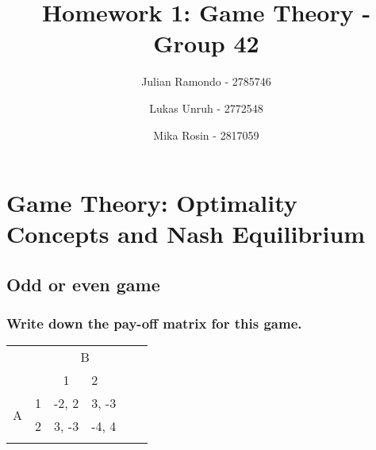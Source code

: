 \documentclass[11pt]{article}
\title{Homework 1: Game Theory - Group 42}
\author{Julian Ramondo - 2785746 \and Lukas Unruh - 2772548 \and Mika Rosin - 2817059}
\begin{document}
    \maketitle


    \section{Game Theory: Optimality Concepts and Nash Equilibrium}

    \subsection{Odd or even game}

    \subsubsection{Write down the pay-off matrix for this game.}
    \begin{table}[h]
        \centering
        \begin{tabular}{llllll}
            & & \multicolumn{2}{c}{B} & & \\
            &                        & \multicolumn{1}{c}{1}      & 2                          & & \\ \cline{3-4}
            \multirow{2}{*}{A} & \multicolumn{1}{r|}{1} & \multicolumn{1}{l|}{-2, 2} & \multicolumn{1}{l|}{3, -3} &  &  \\ \cline{3-4}
            & \multicolumn{1}{l|}{2} & \multicolumn{1}{l|}{3, -3} & \multicolumn{1}{l|}{-4, 4} & & \\ \cline{3-4}
            &                        &                            &                            & &
        \end{tabular}
    \end{table}
\end{document}
